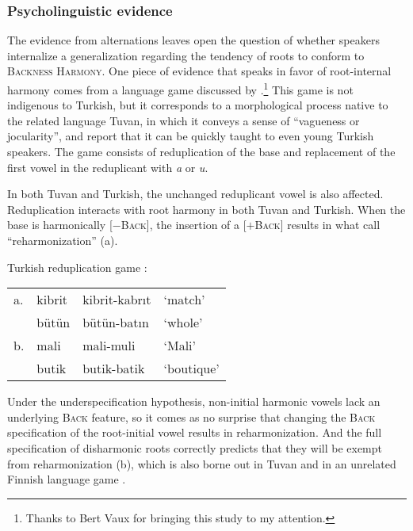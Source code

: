 \subsubsection{Psycholinguistic evidence}

The evidence from alternations leaves open the question of whether speakers internalize a generalization regarding the tendency of roots to conform to \textsc{Backness Harmony}. One piece of evidence that speaks in favor of root-internal harmony comes from a language game discussed by \citet{Harrison2001}.\footnote{Thanks to Bert Vaux for bringing this study to my attention.} This game is not indigenous to Turkish, but it corresponds to a morphological process native to the related language Tuvan, in which it conveys a sense of ``vagueness or jocularity'', and \citeauthor{Harrison2001} report that it can be quickly taught to even young Turkish speakers. The game consists of reduplication of the base and replacement of the first vowel in the reduplicant with \emph{a} or \emph{u}. 

In both Tuvan and Turkish, the unchanged reduplicant vowel is also affected. Reduplication interacts with root harmony in both Tuvan and Turkish. When the base is harmonically [$-$\textsc{Back}], the insertion of a [$+$\textsc{Back}] results in what \citeauthor{Harrison2001} call ``reharmonization'' (\nextx a). 

\begin{example}
\label{redupgame}
Turkish reduplication game \citep[][231]{Harrison2001}: 

\vspace{0.5\baselineskip}
\begin{tabular}{l l l l}
a. & kibrit & kibrit-kabrıt & `match'    \\
   & bütün  & bütün-batın   & `whole'    \\
b. & mali   & mali-muli     & `Mali'     \\
   & butik  & butik-batik   & `boutique' \\
\end{tabular}
\end{example}

\noindent
Under the underspecification hypothesis, non-initial harmonic vowels lack an underlying \textsc{Back} feature, so it comes as no surprise that changing the \textsc{Back} specification of the root-initial vowel results in reharmonization. And the full specification of disharmonic roots correctly predicts that they will be exempt from reharmonization (\lastx b), which is also borne out in Tuvan and in an unrelated Finnish language game \citep{Campbell1986}.

